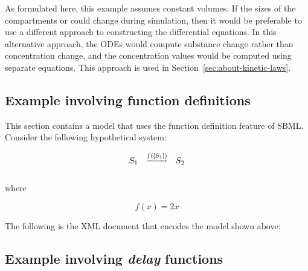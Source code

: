 As formulated here, this example assumes constant volumes.  If the
sizes of the compartments  or  could
change during simulation, then it would be preferable to use a
different approach to constructing the differential equations.  In
this alternative approach, the ODEs would compute substance change
rather than concentration change, and the concentration values
would be computed using separate equations.  This approach is used
in Section~\ref{sec:about-kinetic-laws}.


\subsection{Example involving function definitions}
\label{sec:functioneg}

This section contains a model that uses the function definition
feature of SBML.  Consider the following hypothetical system:
\begin{linenomath}
\begin{equation*}
  \begin{array}{@{}ccc@{}}
    S_1 & \overset{\underrightarrow{f([S_1])}}{} & S_2 \\ \\[-4pt]
  \end{array}
\end{equation*}
\end{linenomath}
where
\begin{linenomath}
\begin{equation*}
    f(x) = 2 x
\end{equation*}
\end{linenomath}

The following is the XML document that encodes the model shown
above:



\subsection{Example involving \emph{delay} functions}
\label{sec:delayeg}


